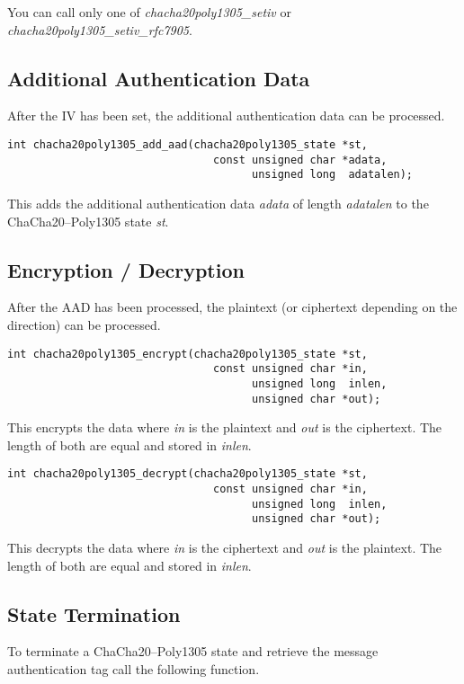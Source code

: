 \documentclass[synpaper]{book}
\begin{document}
You can call only one of \textit{chacha20poly1305\_setiv} or \textit{chacha20poly1305\_setiv\_rfc7905}.

\subsection{Additional Authentication Data}
After the IV has been set, the additional authentication data can be processed.

\begin{verbatim}
int chacha20poly1305_add_aad(chacha20poly1305_state *st,
                                const unsigned char *adata,
                                      unsigned long  adatalen);

\end{verbatim}
This adds the additional authentication data \textit{adata} of length \textit{adatalen} to the ChaCha20--Poly1305 state \textit{st}.

\subsection{Encryption / Decryption}
After the AAD has been processed, the plaintext (or ciphertext depending on the direction) can be processed.

\begin{verbatim}
int chacha20poly1305_encrypt(chacha20poly1305_state *st,
                                const unsigned char *in,
                                      unsigned long  inlen,
                                      unsigned char *out);
\end{verbatim}
This encrypts the data where \textit{in} is the plaintext and \textit{out} is the ciphertext. The length of both are equal and stored in \textit{inlen}.

\begin{verbatim}
int chacha20poly1305_decrypt(chacha20poly1305_state *st,
                                const unsigned char *in,
                                      unsigned long  inlen,
                                      unsigned char *out);
\end{verbatim}
This decrypts the data where \textit{in} is the ciphertext and \textit{out} is the plaintext. The length of both are equal and stored in \textit{inlen}.

\subsection{State Termination}
To terminate a ChaCha20--Poly1305 state and retrieve the message authentication tag call the following function.
\end{document}
